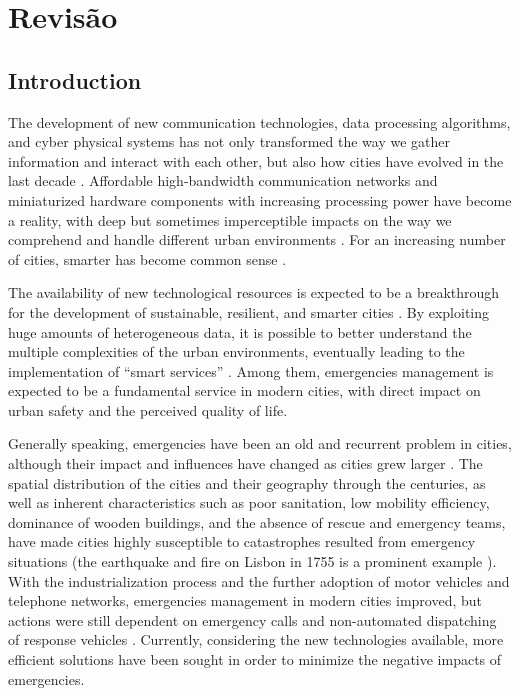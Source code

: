 \chapter{Revisão}
\begin{refsection}
\section{Introduction}

The development of new communication technologies, data processing algorithms, and cyber physical systems has not only transformed the way we gather information and interact with each other, but also how cities have evolved in the last decade \cite{smartcities1,smartcities7}. Affordable high-bandwidth communication networks and miniaturized hardware components with increasing processing power have become a reality, with deep but sometimes imperceptible impacts on the way we comprehend and handle different urban environments \cite{smartcities2,smartcities3}. For an increasing number of cities, smarter has become common sense \cite{smartcities8}.

The availability of new technological resources is expected to be a breakthrough for the development of sustainable, resilient, and smarter cities \cite{smartcities4}. By exploiting huge amounts of heterogeneous data, it is possible to better understand the multiple complexities of the urban environments, eventually leading to the implementation of ``smart services'' \cite{citiesvehicles,citiesdata,twitterDetection2}. Among them, emergencies management is expected to be a fundamental service in modern cities, with direct impact on urban safety and the perceived quality of life.

Generally speaking, emergencies have been an old and recurrent problem in cities, although their impact and influences have changed as cities grew larger \cite{emergenciesmetric1}. The spatial distribution of the cities and their geography through the centuries, as well as inherent characteristics such as poor sanitation, low mobility efficiency, dominance of wooden buildings, and the absence of rescue and emergency teams, have made cities highly susceptible to catastrophes resulted from emergency situations (the earthquake and fire on Lisbon in 1755 is a prominent example \cite{lisbon}). With the industrialization process and the further adoption of motor vehicles and telephone networks, emergencies management in modern cities improved, but actions were still dependent on emergency calls and non-automated dispatching of response vehicles \cite{fireevolution}. Currently, considering the new technologies available, more efficient solutions have been sought in order to minimize the negative impacts of emergencies.


\end{refsection}
